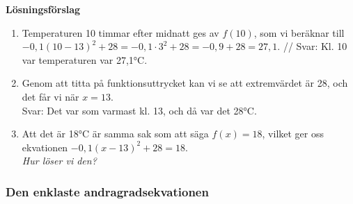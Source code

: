 \textbf{Lösningsförslag}
\begin{enumerate}[label=\Alph*]
  \item Temperaturen 10 timmar efter midnatt ges av $f(10)$, som vi beräknar till $-0,1(10-13)^2+28 = -0,1 \cdot 3^2 + 28 = -0,9+28 = 27,1$. //
  Svar: Kl. 10 var temperaturen var 27,1°C.
  \item Genom att titta på funktionsuttrycket kan vi se att extremvärdet är 28, och det får vi när $x=13$. \\
  Svar: Det var som varmast kl. 13, och då var det 28°C.
  \item Att det är 18°C är samma sak som att säga $f(x)=18$, vilket ger oss ekvationen $-0,1(x-13)^2+28=18$. \\
  \emph{Hur löser vi den?}
\end{enumerate}

\subsubsection{Den enklaste andragradsekvationen}

